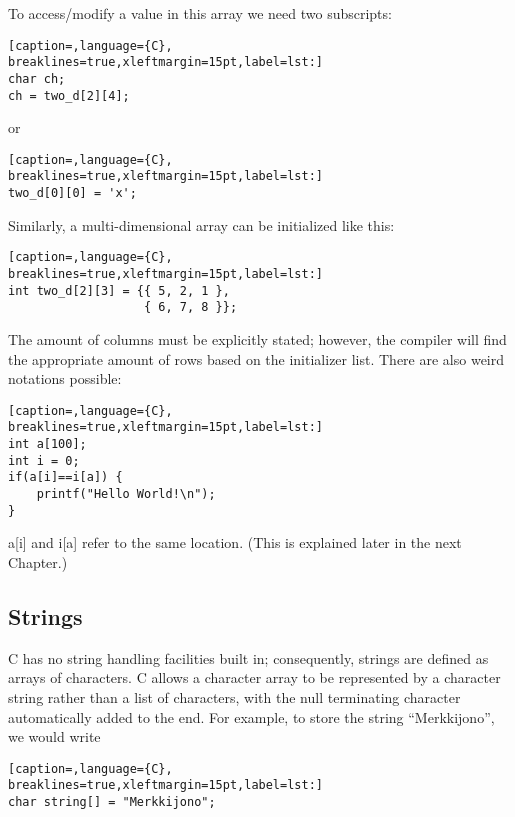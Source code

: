 To access/modify a value in this array we need two subscripts:
\lstset{basicstyle=\scriptsize, numbers=left, captionpos=b, tabsize=4}
\begin{lstlisting}[caption=,language={C},
breaklines=true,xleftmargin=15pt,label=lst:]
char ch;
ch = two_d[2][4];
\end{lstlisting}

or
\lstset{basicstyle=\scriptsize, numbers=left, captionpos=b, tabsize=4}
\begin{lstlisting}[caption=,language={C},
breaklines=true,xleftmargin=15pt,label=lst:]
two_d[0][0] = 'x';
\end{lstlisting}

Similarly, a multi-dimensional array can be initialized like this:
\lstset{basicstyle=\scriptsize, numbers=left, captionpos=b, tabsize=4}
\begin{lstlisting}[caption=,language={C},
breaklines=true,xleftmargin=15pt,label=lst:]
int two_d[2][3] = {{ 5, 2, 1 },
                   { 6, 7, 8 }};
\end{lstlisting}

The amount of columns must be explicitly stated; however, the compiler will
find the appropriate amount of rows based on the initializer list.  There are
also weird notations possible:
\lstset{basicstyle=\scriptsize, numbers=left, captionpos=b, tabsize=4}
\begin{lstlisting}[caption=,language={C},
breaklines=true,xleftmargin=15pt,label=lst:]
int a[100];
int i = 0;
if(a[i]==i[a]) {
	printf("Hello World!\n");
}
\end{lstlisting}

a[i] and i[a] refer to the same location. (This is explained later in the next
Chapter.)

\subsection{Strings}
C has no string handling facilities built in; consequently, strings are defined
as arrays of characters. C allows a character array to be represented by a
character string rather than a list of characters, with the null terminating
character automatically added to the end. For example, to store the string
``Merkkijono'', we would write
\lstset{basicstyle=\scriptsize, numbers=left, captionpos=b, tabsize=4}
\begin{lstlisting}[caption=,language={C},
breaklines=true,xleftmargin=15pt,label=lst:]
char string[] = "Merkkijono";
\end{lstlisting}

